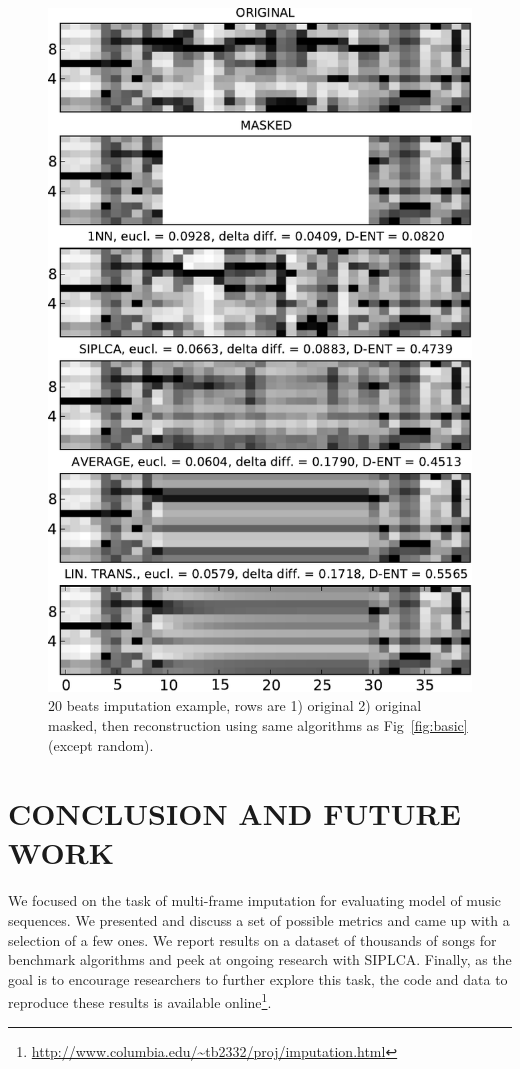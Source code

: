 \documentclass{article}
\begin{document}
\begin{figure}[t]
\begin{center}
\includegraphics[width=.75\columnwidth]{basic3}
\end{center}
\caption{$20$ beats imputation example, rows are 1) original 2) original masked,
then reconstruction using same algorithms as Fig~\ref{fig:basic} (except random).
\label{fig:basic3}}
\end{figure}

\section{CONCLUSION AND FUTURE WORK}
\label{sec:conclusion}
We focused on the task of multi-frame imputation for evaluating model
of music sequences. We presented and discuss a set of possible metrics
and came up with a selection of a few ones.  We report results on a
dataset of thousands of songs for benchmark algorithms and peek at
ongoing research with SIPLCA. Finally, as the goal is to encourage
researchers to further explore this task, the code and data to
reproduce these results is available
online\footnote{\scriptsize\url{http://www.columbia.edu/~tb2332/proj/imputation.html}}.






\end{document}
